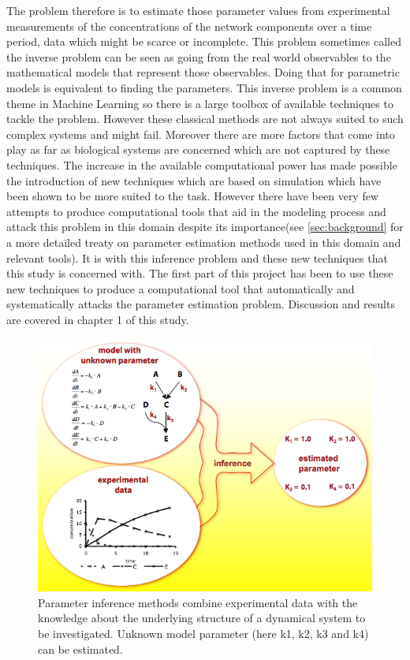 The problem therefore is to estimate those parameter values from experimental measurements of the concentrations of the network components over a time period, data which might be scarce or incomplete. This problem sometimes called the inverse problem can be seen as going from the real world observables to the mathematical models that represent those observables. Doing that for parametric models is equivalent to finding the parameters. This inverse problem is a common theme in Machine Learning so there is a large toolbox of available techniques to tackle the problem. However these classical methods are not always suited to such complex systems and might fail. Moreover there are more factors that come into play as far as biological systems are concerned which are not captured by these techniques. The increase in the available computational power has made possible the introduction of new techniques which are based on simulation which have been shown to be more suited to the task. However there have been very few attempts to produce computational tools that aid in the modeling process and attack this problem in this domain despite its importance(see \ref{sec:background} for a more detailed treaty on parameter estimation methods used in this domain and relevant tools). It is with this inference problem and these new techniques that this study is concerned with.  The first part of this project has been to use these new techniques to produce a computational tool that automatically and systematically attacks the parameter estimation problem. Discussion and results are covered in chapter 1 of this study. 

\begin{figure}
\centering
\includegraphics[width=0.5\linewidth]{inference}
\caption{Parameter inference methods combine experimental data with the knowledge about the underlying structure of a dynamical system to be investigated. Unknown model parameter (here k1, k2, k3 and k4) can be estimated.}
\label{fig:inference}
\end{figure}

